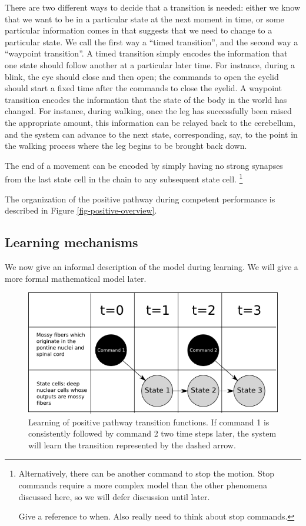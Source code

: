 \documentclass{article}
\theoremstyle{definition}
\begin{document}
There are two different ways to decide that a transition is needed:
either we know that we want to be in a particular state at the next
moment in time, or some particular information comes in that suggests
that we need to change to a particular state. We call the first way a
``timed transition'', and the second way a ``waypoint transition''. A
timed transition simply encodes the information that one state should
follow another at a particular later time. For instance, during a
blink, the eye should close and then open; the commands to open the
eyelid should start a fixed time after the commands to close the
eyelid. A waypoint transition encodes the information that the state
of the body in the world has changed. For instance, during walking,
once the leg has successfully been raised the appropriate amount, this
information can be relayed back to the cerebellum, and the system can
advance to the next state, corresponding, say, to the point in the
walking process where the leg begins to be brought back down.

The end of a movement can be encoded by simply having no strong
synapses from the last state cell in the chain to any subsequent state
cell. 
\footnote{Alternatively, there can be another command to stop the
motion. Stop commands require a more complex model than the other
phenomena discussed here, so we will defer discussion until later. 

Give a reference to when. Also really need to think about stop
commands.}

The organization of the positive pathway during competent performance
is described in Figure \ref{fig-positive-overview}.

\subsection{Learning mechanisms}
\label{sec-learning-mech}

We now give an informal description of the model during learning. We
will give a more formal mathematical model later. 

\begin{figure}
\includegraphics[width=0.95\linewidth]{positive_transition.png}
\caption{Learning of positive pathway transition functions. If command
  1 is consistently followed by command 2 two time steps later, the
  system will learn the transition represented by the dashed arrow.}
\label{fig-positive-transition}
\end{figure}
\end{document}
